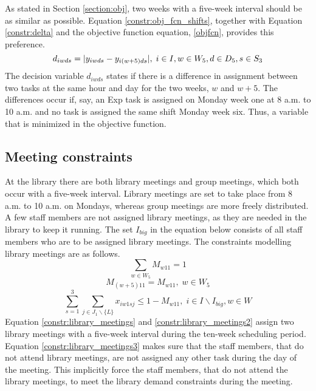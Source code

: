 As stated in Section \ref{section:obj}, two weeks with a five-week interval should be as similar as possible. Equation \ref{constr:obj_fcn_shifts}, together with Equation \ref{constr:delta} and the objective function equation, \ref{objfcn}, provides this preference.
\begin{equation} \label{constr:obj_fcn_shifts}
d_{iwds} = \lvert y_{iwds} - y_{i(w+5)ds}\rvert, \;   i \in I, w \in W_5, d \in D_5, s \in S_3
\end{equation}
The decision variable $d_{iwds}$ states if there is a difference in assignment between two tasks at the same hour and day for the two weeks, $w$ and $w+5$. The differences occur if, say, an Exp task is assigned on Monday week one at 8 a.m. to 10 a.m. and no task is assigned the same shift Monday week six. Thus, a variable that is minimized in the objective function.

\subsection{Meeting constraints} \label{section:meeting_constraints}
At the library there are both library meetings and group meetings, which both occur with a five-week interval. Library meetings are set to take place from 8 a.m. to 10 a.m. on Mondays, whereas group meetings are more freely distributed. A few staff members are not assigned library meetings, as they are needed in the library to keep it running. The set $I_{big}$ in the equation below consists of all staff members who are to be assigned library meetings. The constraints modelling library meetings are as follows.
\begin{equation} \label{constr:library_meetings}
\sum_{w \in W_5} M_{w11} = 1
\end{equation}
\begin{equation} \label{constr:library_meetings2}
M_{(w+5)11} = M_{w11}, \;   w \in W_5
\end{equation}
\begin{equation} \label{constr:library_meetings3}
\sum_{s=1}^{3} \sum_{j \in J_1 \backslash \{L\}} x_{iw1sj} \leq 1-M_{w11}, \;   i \in I \backslash I_{big}, w \in W
\end{equation}
Equation \ref{constr:library_meetings} and \ref{constr:library_meetings2} assign two library meetings with a five-week interval during the ten-week scheduling period. Equation \ref{constr:library_meetings3} makes sure that the staff members, that do not attend library meetings, are not assigned any other task during the day of the meeting. This implicitly force the staff members, that do not attend the library meetings, to meet the library demand constraints during the meeting. 

